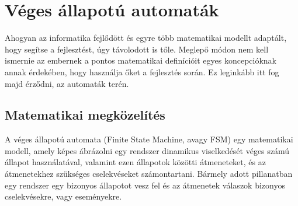 \chapter[FSM]{Véges állapotú automaták}
\label{chap:FSM}

Ahogyan az informatika fejlődött és egyre több matematikai modellt adap\-tált, hogy segítse a fejlesztést, úgy távolodott is tőle. Meglepő módon nem kell ismernie az embernek a pontos matematikai definícióit egyes koncepcióknak annak érdekében, hogy használja őket a fejlesztés során. Ez leginkább itt fog majd érződni, az automaták terén.

\section{Matematikai megközelítés}

A véges állapotú automata (Finite State Machine, avagy FSM) egy matematikai modell, amely képes ábrázolni egy rendszer dinamikus viselkedését véges számú állapot használatával, valamint ezen állapotok közötti átmeneteket, és az átmenetekhez szükséges cselekvéseket számontartani. Bármely adott pillanatban egy rendszer egy bizonyos állapotot vesz fel és az átmenetek válaszok bizonyos cselekvésekre, vagy eseményekre.

